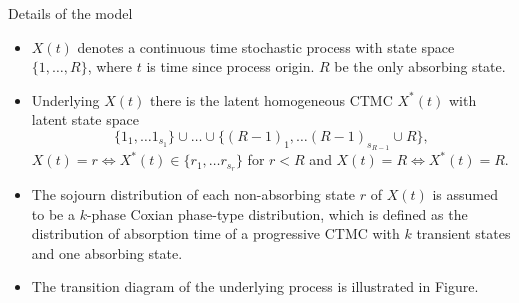 \documentclass{beamer}
\begin{document}
\begin{frame}{Details of the model}
\begin{itemize}
\item $X(t)$ denotes a continuous time stochastic process with state space $\{1,\ldots, R\}$, where $t$ is time since process origin. $R$ be the only absorbing state. 
\vspace{2mm}
\item Underlying $X(t)$ there is the latent homogeneous CTMC $X^*(t)$ with latent state space \vspace{-2mm} \[  \{1_1,\ldots1_{s_1}\}\cup \ldots \cup \{(R-1)_1,\ldots (R-1)_{s_{R-1}} \cup R\},\] $X(t)=r \Leftrightarrow X^*(t) \in \{r_1,\ldots r_{s_r}\}$ for $r<R$ and $X(t)=R \Leftrightarrow X^*(t) =R$. 
\vspace{2mm}
\item The sojourn distribution of each non-absorbing state $r$ of $X(t)$ is assumed to be a $k$-phase Coxian phase-type distribution, which is defined as the distribution of absorption time of a progressive CTMC with $k$ transient states and one absorbing state.
\vspace{2mm}
\item The transition diagram of the underlying process is illustrated in Figure.

\end{itemize}
\end{frame}
\end{document}

